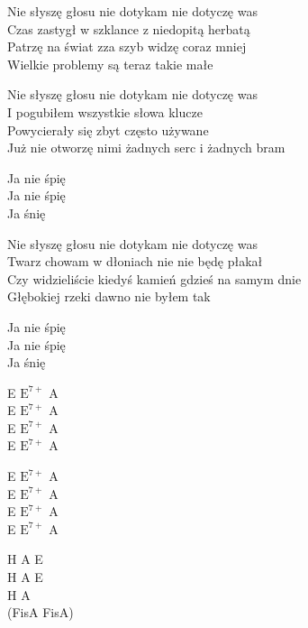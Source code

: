 \begin{text}
    Nie słyszę głosu nie dotykam nie dotyczę was\\
    Czas zastygł w szklance z niedopitą herbatą\\
    Patrzę na świat zza szyb widzę coraz mniej\\
    Wielkie problemy są teraz takie małe

    Nie słyszę głosu nie dotykam nie dotyczę was\\
    I pogubiłem wszystkie słowa klucze\\
    Powycierały się zbyt często używane\\
    Już nie otworzę nimi żadnych serc i żadnych bram

    Ja nie śpię\\
    Ja nie śpię\\
    Ja śnię

    Nie słyszę głosu nie dotykam nie dotyczę was\\
    Twarz chowam w dłoniach nie nie będę płakał\\
    Czy widzieliście kiedyś kamień gdzieś na samym dnie\\
    Głębokiej rzeki dawno nie byłem tak

    Ja nie śpię\\
    Ja nie śpię\\
    Ja śnię
\end{text}
\begin{chord}
    E $\mathrm{E^{7+}}$ A\\
    E $\mathrm{E^{7+}}$ A\\
    E $\mathrm{E^{7+}}$ A\\
    E $\mathrm{E^{7+}}$ A

    E $\mathrm{E^{7+}}$ A\\
    E $\mathrm{E^{7+}}$ A\\
    E $\mathrm{E^{7+}}$ A\\
    E $\mathrm{E^{7+}}$ A

    H A E\\
    H A E\\
    H A\\
    (FisA FisA)
\end{chord}
